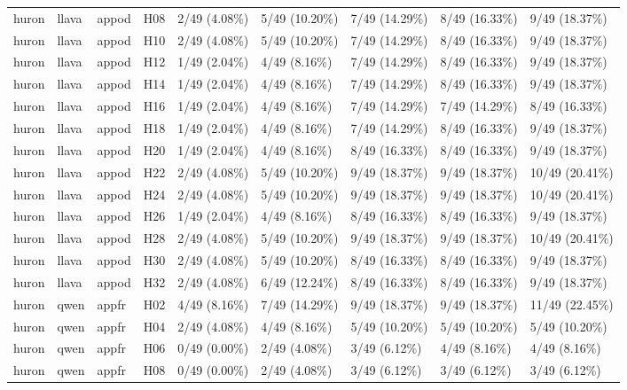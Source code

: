 \begin{longtable}{lllllllll}
huron & llava & appod & H08 & 2/49 (4.08\%) & 5/49 (10.20\%) & 7/49 (14.29\%) & 8/49 (16.33\%) & 9/49 (18.37\%) \\
huron & llava & appod & H10 & 2/49 (4.08\%) & 5/49 (10.20\%) & 7/49 (14.29\%) & 8/49 (16.33\%) & 9/49 (18.37\%) \\
huron & llava & appod & H12 & 1/49 (2.04\%) & 4/49 (8.16\%) & 7/49 (14.29\%) & 8/49 (16.33\%) & 9/49 (18.37\%) \\
huron & llava & appod & H14 & 1/49 (2.04\%) & 4/49 (8.16\%) & 7/49 (14.29\%) & 8/49 (16.33\%) & 9/49 (18.37\%) \\
huron & llava & appod & H16 & 1/49 (2.04\%) & 4/49 (8.16\%) & 7/49 (14.29\%) & 7/49 (14.29\%) & 8/49 (16.33\%) \\
huron & llava & appod & H18 & 1/49 (2.04\%) & 4/49 (8.16\%) & 7/49 (14.29\%) & 8/49 (16.33\%) & 9/49 (18.37\%) \\
huron & llava & appod & H20 & 1/49 (2.04\%) & 4/49 (8.16\%) & 8/49 (16.33\%) & 8/49 (16.33\%) & 9/49 (18.37\%) \\
huron & llava & appod & H22 & 2/49 (4.08\%) & 5/49 (10.20\%) & 9/49 (18.37\%) & 9/49 (18.37\%) & 10/49 (20.41\%) \\
huron & llava & appod & H24 & 2/49 (4.08\%) & 5/49 (10.20\%) & 9/49 (18.37\%) & 9/49 (18.37\%) & 10/49 (20.41\%) \\
huron & llava & appod & H26 & 1/49 (2.04\%) & 4/49 (8.16\%) & 8/49 (16.33\%) & 8/49 (16.33\%) & 9/49 (18.37\%) \\
huron & llava & appod & H28 & 2/49 (4.08\%) & 5/49 (10.20\%) & 9/49 (18.37\%) & 9/49 (18.37\%) & 10/49 (20.41\%) \\
huron & llava & appod & H30 & 2/49 (4.08\%) & 5/49 (10.20\%) & 8/49 (16.33\%) & 8/49 (16.33\%) & 9/49 (18.37\%) \\
huron & llava & appod & H32 & 2/49 (4.08\%) & 6/49 (12.24\%) & 8/49 (16.33\%) & 8/49 (16.33\%) & 9/49 (18.37\%) \\
huron & qwen & appfr & H02 & 4/49 (8.16\%) & 7/49 (14.29\%) & 9/49 (18.37\%) & 9/49 (18.37\%) & 11/49 (22.45\%) \\
huron & qwen & appfr & H04 & 2/49 (4.08\%) & 4/49 (8.16\%) & 5/49 (10.20\%) & 5/49 (10.20\%) & 5/49 (10.20\%) \\
huron & qwen & appfr & H06 & 0/49 (0.00\%) & 2/49 (4.08\%) & 3/49 (6.12\%) & 4/49 (8.16\%) & 4/49 (8.16\%) \\
huron & qwen & appfr & H08 & 0/49 (0.00\%) & 2/49 (4.08\%) & 3/49 (6.12\%) & 3/49 (6.12\%) & 3/49 (6.12\%) \\

\end{longtable}
